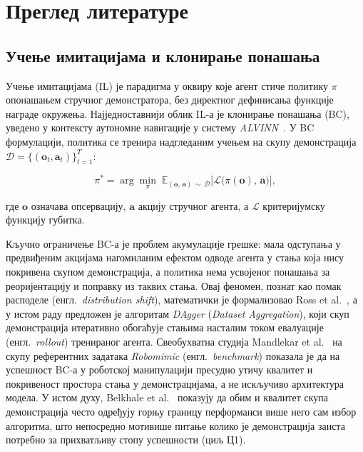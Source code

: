 \documentclass[12pt, a4paper]{article}
\begin{document}
\section{Преглед литературе}
\label{sec:pregled_literature}

\subsection{Учење имитацијама и клонирање понашања}
\label{subsec:il_bc}

Учење имитацијама (IL) је парадигма у оквиру које агент стиче политику $\pi$ опонашањем стручног демонстратора, без директног дефинисања функције награде окружења.
Најједноставнији облик IL-а је клонирање понашања (BC), уведено у контексту аутономне навигације у систему \textit{ALVINN}~\cite{pomerleau1989alvinn}.
У BC формулацији, политика се тренира надгледаним учењем на скупу демонстрација $\mathcal{D} = \{(\mathbf{o}_t, \mathbf{a}_t)\}_{t=1}^{T}$:

\begin{equation}
    \pi^* = \arg\min_\pi \;\mathbb{E}_{(\mathbf{o},\,\mathbf{a})\,\sim\,\mathcal{D}}\bigl[\mathcal{L}\bigl(\pi(\mathbf{o}),\,\mathbf{a}\bigr)\bigr],
    \label{eq:bc_objective}
\end{equation}

\noindent где $\mathbf{o}$ означава опсервацију, $\mathbf{a}$ акцију стручног агента, а $\mathcal{L}$ критеријумску функцију губитка.

Кључно ограничење BC-а је проблем акумулације грешке: мала одступања у предвиђеним акцијама нагомиланим ефектом одводе агента у стања која нису покривена скупом демонстрација, а политика нема усвојеног понашања за реоријентацију и поправку из таквих стања.
Овај феномен, познат као помак расподеле (енгл.\ \textit{distribution shift}), математички је формализовао Ross et al.~\cite{ross2011dagger}, а у истом раду предложен је алгоритам \textit{DAgger} (\textit{Dataset Aggregation}), који скуп демонстрација итеративно обогаћује стањима насталим током евалуације (енгл.\ \textit{rollout}) тренираног агента.
Свеобухватна студија Mandlekar et al.~\cite{mandlekar2021robomimic} на скупу референтних задатака \textit{Robomimic} (енгл.\ \textit{benchmark}) показала је да на успешност BC-а у роботској манипулацији пресудно утичу квалитет и покривеност простора стања у демонстрацијама, а не искључиво архитектура модела.
У истом духу, Belkhale et al.~\cite{belkhale2023dataquality} показују да обим и квалитет скупа демонстрација често одређују горњу границу перформанси више него сам избор алгоритма, што непосредно мотивише питање колико је демонстрација заиста потребно за прихватљиву стопу успешности (циљ Ц1).
\end{document}
